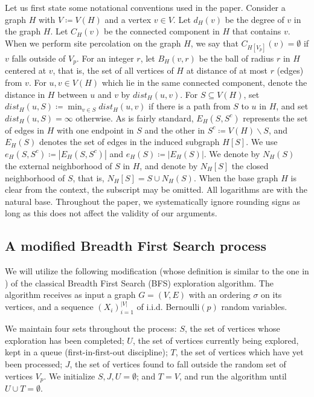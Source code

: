 \documentclass[notitlepage]{scrartcl}
\begin{document}
Let us first state some notational conventions used in the paper. Consider a graph $H$ with $V\coloneqq V(H)$ and a vertex $v \in V$. Let $d_H(v)$ be the degree of $v$ in the graph $H$. Let $C_H(v)$ be the connected component in $H$ that contains $v$. When we perform site percolation on the graph $H$, we say that $C_{H[V_p]}(v)=\emptyset$ if $v$ falls outside of $V_p$. For an integer $r$, let $B_H(v, r)$ be the ball of radius $r$ in $H$ centered at $v$, that is, the set of all vertices of $H$ at distance of at most $r$ (edges) from $v$. For $u, v \in V (H)$ which lie in the same connected component, denote the distance in $H$ between $u$ and $v$ by $dist_H(u, v)$. For $S \subseteq V (H)$, set $dist_H(u, S) \coloneqq \min_{v\in S} dist_H(u, v)$ if there is a path from $S$ to $u$ in $H$, and set $dist_H(u, S)=\infty$ otherwise. As is fairly standard, $E_H(S, S^c)$ represents the set of edges in $H$ with one endpoint in $S$ and the other in $S^c\coloneqq V(H) \backslash S$, and $E_H(S)$ denotes the set of edges in the induced subgraph $H[S]$. We use $e_H(S, S^c) \coloneqq |E_H(S, S^c)|$ and $e_H(S) \coloneqq |E_H(S)|$. We denote by $N_H(S)$ the external neighborhood of $S$ in $H$, and denote by $N_H[S]$ the closed neighborhood of $S$, that is, $N_H[S]=S\cup N_H(S)$. When the base graph $H$ is clear from the context, the subscript may be omitted. All logarithms are with the natural base. Throughout the paper, we systematically ignore rounding signs as long as this does not affect the validity of our arguments.

\subsection{A modified Breadth First Search process}

We will utilize the following modification (whose definition is similar to the one in \cite{zbMATH08098276,zbMATH06534995}) of the classical Breadth First Search (BFS) exploration algorithm. The algorithm receives as input a graph $G = (V, E)$ with an ordering $\sigma$ on its vertices, and a sequence $(X_i)_{i=1}^{|V|}$ of i.i.d. Bernoulli$(p)$ random variables.

We maintain four sets throughout the process: $S$, the set of vertices whose exploration has been completed; $U$, the set of vertices currently being explored, kept in a queue (first-in-first-out discipline); $T$, the set of vertices which have yet been processed; $J$, the set of vertices found to fall outside the random set of vertices $V_p$. We initialize $S, J, U = \emptyset$; and $T=V$, and run the algorithm until $U\cup T=\emptyset$.
\end{document}
